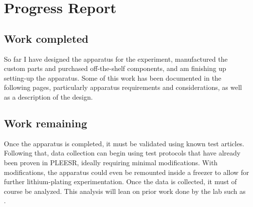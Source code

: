 \chapter{Progress Report}

\section{Work completed}
So far I have designed the apparatus for the experiment, manufactured the custom parts and purchased off-the-shelf components, and am finishing up setting-up the apparatus. Some of this work has been documented in the following pages, particularly apparatus requirements and considerations, as well as a description of the design. 

\section{Work remaining}
Once the apparatus is completed, it must be validated using known test articles. Following that, data collection can begin using test protocols that have already been proven in PLEESR, ideally requiring minimal modifications. With modifications, the apparatus could even be remounted inside a freezer to allow for further lithium-plating experimentation. Once the data is collected, it must of course be analyzed. This analysis will lean on prior work done by the lab such as \cite{ANODE-CHAR} \cite{SOC-SOH-EST} \cite{TOF-STATE}.